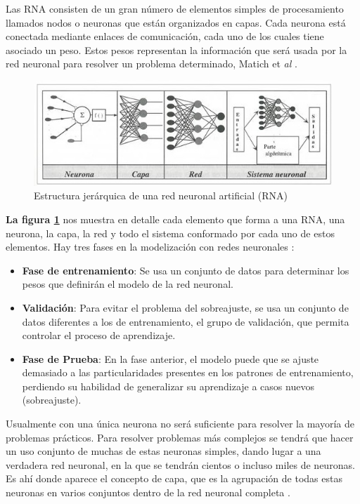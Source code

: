 Las RNA consisten de un gran número de elementos simples de procesamiento llamados nodos o neuronas que están organizados en capas. Cada neurona está conectada mediante enlaces de comunicación, cada uno de los cuales tiene asociado un peso. Estos pesos representan la información que será usada por la red neuronal para resolver un problema determinado, Matich et \textit{al} \cite{matich2001redes}.\\ 

\begin{figure}[H]
    \centering
    \includegraphics[width=1\linewidth]{imagenes/perceptron.jpg}
    \caption{Estructura jerárquica de una red neuronal artificial (RNA)}
    \label{fig:Estructura jerárquica de una red neuronal artificial (RNA)}
\end{figure}

\textbf{La figura \ref{fig:Estructura jerárquica de una red neuronal artificial (RNA)}} nos muestra en detalle cada elemento que forma a una RNA, una neurona, la capa, la red y todo el sistema conformado por cada uno de estos elementos. Hay tres fases en la modelización con redes neuronales \cite{marin2013introduccion}:

\begin{itemize}
    \item \textbf{Fase de entrenamiento}: Se usa un conjunto de datos para determinar los pesos que definirán el modelo de la red neuronal.
     \item \textbf{Validación}: Para evitar el problema del sobreajuste, se usa un conjunto de datos diferentes a los de entrenamiento, el grupo de validación, que permita controlar el proceso de aprendizaje.
    \item \textbf{Fase de Prueba}: En la fase anterior, el modelo puede que se ajuste demasiado a las particularidades presentes en los patrones de entrenamiento, perdiendo su habilidad de generalizar su aprendizaje a casos nuevos (sobreajuste).
\end{itemize}    
Usualmente con una única neurona no será suficiente para resolver la mayoría de problemas prácticos. Para resolver problemas más complejos se tendrá que hacer un uso conjunto de muchas de estas neuronas simples, dando lugar a una verdadera red neuronal, en la que se tendrán cientos o incluso miles de neuronas. Es ahí donde aparece el concepto de capa, que es la agrupación de todas estas neuronas en varios conjuntos dentro de la red neuronal completa \cite{duran2017redes}. 
    

